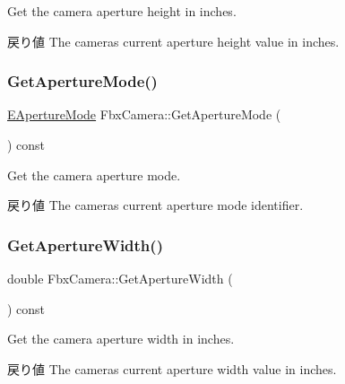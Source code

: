 Get the camera aperture height in inches. \begin{DoxyReturn}{戻り値}
The camera\textquotesingle{}s current aperture height value in inches. 
\end{DoxyReturn}
\mbox{\label{class_fbx_camera_a3dea5cf232d8faafbc4c5a720fde419c}} 
\subsubsection{\texorpdfstring{Get\+Aperture\+Mode()}{GetApertureMode()}}
{\footnotesize\ttfamily \hyperlink{class_fbx_camera_addeea6fc943ce5f087dbc54c142f890e}{E\+Aperture\+Mode} Fbx\+Camera\+::\+Get\+Aperture\+Mode (\begin{DoxyParamCaption}{ }\end{DoxyParamCaption}) const}

Get the camera aperture mode. \begin{DoxyReturn}{戻り値}
The camera\textquotesingle{}s current aperture mode identifier. 
\end{DoxyReturn}
\mbox{\label{class_fbx_camera_a7f9c7299e3a40cf708e97b13107396cc}} 
\subsubsection{\texorpdfstring{Get\+Aperture\+Width()}{GetApertureWidth()}}
{\footnotesize\ttfamily double Fbx\+Camera\+::\+Get\+Aperture\+Width (\begin{DoxyParamCaption}{ }\end{DoxyParamCaption}) const}

Get the camera aperture width in inches. \begin{DoxyReturn}{戻り値}
The camera\textquotesingle{}s current aperture width value in inches. 
\end{DoxyReturn}
\mbox{\label{class_fbx_camera_ad60e1323bdb9f349dbb96e5d8bdf716a}} 
